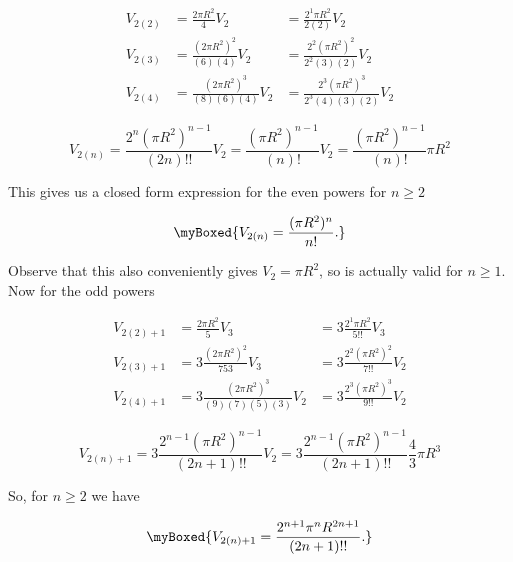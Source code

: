 {\begin{equation}\label{eqn:basicStatMechProblemSet3Problem1:360}
\begin{array}{lll}
V_{2(2)} 
&= \frac{2 \pi R^2}{4} V_{2} 
&= \frac{2^1 \pi R^2}{2(2)} V_{2}  \\
V_{2(3)} 
&= \frac{(2 \pi R^2)^2}{(6)(4)} V_{2} 
&= \frac{2^2 (\pi R^2)^2}{2^2 (3)(2)} V_{2}  \\
V_{2(4)} 
&= \frac{(2 \pi R^2)^3}{(8)(6)(4)} V_{2} 
&= \frac{2^3 (\pi R^2)^3}{2^3 (4)(3)(2)} V_{2}  
\end{array}
\end{equation}

\begin{dmath}\label{eqn:basicStatMechProblemSet3Problem1:380}
V_{2(n)} 
= \frac{2^n (\pi R^2)^{n-1}}{(2n)!!} V_{2} 
= \frac{(\pi R^2)^{n-1}}{(n)!} V_{2} 
= \frac{(\pi R^2)^{n-1}}{(n)!} \pi R^2
\end{dmath}

This gives us a closed form expression for the even powers for $n \ge 2$

\begin{equation}\label{eqn:basicStatMechProblemSet3Problem1:400}
\myBoxed{
V_{2(n)} = \frac{(\pi R^2)^{n}}{n!}.
}
\end{equation}

Observe that this also conveniently gives $V_2 = \pi R^2$, so is actually valid for $n \ge 1$.  Now for the odd powers

\begin{equation}\label{eqn:basicStatMechProblemSet3Problem1:420}
\begin{array}{lll}
V_{2(2)+1} 
&= \frac{2 \pi R^2}{5} V_{3} 
&= 3 \frac{2^1 \pi R^2}{5!!} V_{3}  \\
V_{2(3)+1} 
&= 3 \frac{(2 \pi R^2)^2}{7 5 3} V_{3} 
&= 3 \frac{2^2 (\pi R^2)^2}{7!!} V_{2}  \\
V_{2(4)+1} 
&= 3 \frac{(2 \pi R^2)^3}{(9)(7)(5)(3)} V_{2} 
&= 3 \frac{2^3 (\pi R^2)^3}{9!!} V_{2}  
\end{array}
\end{equation}

\begin{dmath}\label{eqn:basicStatMechProblemSet3Problem1:440}
V_{2(n)+1} 
= 3 \frac{2^{n-1} (\pi R^2)^{n-1}}{(2n +1)!!} V_{2}  
= 3 \frac{2^{n-1} (\pi R^2)^{n-1}}{(2n +1)!!} \frac{4}{3} \pi R^3
\end{dmath}

So, for $n \ge 2$ we have

\begin{equation}\label{eqn:basicStatMechProblemSet3Problem1:460}
\myBoxed{
V_{2(n)+1} = \frac{2^{n+1} \pi^n R^{2 n + 1}}{(2n +1)!!}.
}
\end{equation}

}
